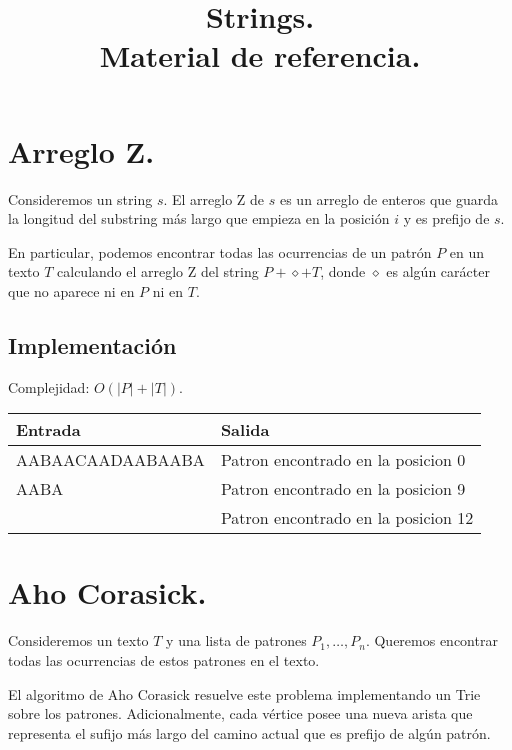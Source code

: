 \documentclass[12pt, letterpaper, twoside]{article}
\title{Strings.\\
	  \large Material de referencia.}
\author{}
\date{}
\begin{document}
\maketitle

\tableofcontents

\newpage

\section{Arreglo Z.}

Consideremos un string $s$. El arreglo Z de $s$ es un arreglo de enteros que guarda la longitud del substring más largo que empieza en la posición $i$ y es prefijo de $s$. 

En particular, podemos encontrar todas las ocurrencias de un patrón $P$ en un texto $T$ calculando el arreglo Z del string $P + \diamond + T$, donde $\diamond$ es algún carácter que no aparece ni en $P$ ni en $T$.

\subsection{Implementación}

Complejidad: $O(|P| + |T|)$.

 \medskip

\begin{tabular}{|p{7cm}|p{7cm}|}
\hline
\textbf{Entrada} & \textbf{Salida}\\ \hline
AABAACAADAABAABA & Patron encontrado en la posicion 0\\
AABA             & Patron encontrado en la posicion 9\\
                 & Patron encontrado en la posicion 12\\ \hline
\end{tabular}

\newpage

\section{Aho Corasick.}

Consideremos un texto $T$ y una lista de patrones $P_1, \ldots, P_n$. Queremos encontrar todas las ocurrencias de estos patrones en el texto.

El algoritmo de Aho Corasick resuelve este problema implementando un Trie sobre los patrones. Adicionalmente, cada vértice posee una nueva arista que representa el sufijo más largo del camino actual que es prefijo de algún patrón.
\end{document}
